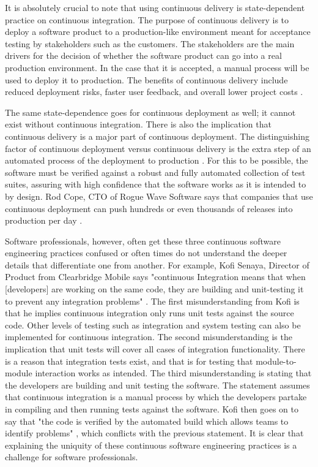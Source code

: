 \documentclass[12pt,a4paper]{article}
\begin{document}
It is absolutely crucial to note that using continuous delivery is state-dependent practice on continuous integration. The purpose of continuous delivery is to deploy a software product to a production-like environment meant for acceptance testing by stakeholders such as the customers. The stakeholders are the main drivers for the decision of whether the software product can go into a real production environment. In the case that it is accepted, a manual process will be used to deploy it to production. The benefits of continuous delivery include reduced deployment risks, faster user feedback, and overall lower project costs \cite[p. ~3910-3911]{shahin_babar_zhu_2017}.

The same state-dependence goes for continuous deployment as well; it cannot exist without continuous integration. There is also the implication that continuous delivery is a major part of continuous deployment. The distinguishing factor of continuous deployment versus continuous delivery is the extra step of an automated process of the deployment to production \cite[p. ~3911]{shahin_babar_zhu_2017}. For this to be possible, the software must be verified against a robust and fully automated collection of test suites, assuring with high confidence that the software works as it is intended to by design. Rod Cope, CTO of Rogue Wave Software says that companies that use continuous deployment can push hundreds or even thousands of releases into production per day \cite{stackify_2018}.

Software professionals, however, often get these three continuous software engineering practices confused or often times do not understand the deeper details that differentiate one from another. For example, Kofi Senaya, Director of Product from Clearbridge Mobile says "continuous Integration means that when [developers] are working on the same code, they are building and unit-testing it to prevent any integration problems" \cite{stackify_2018}. The first misunderstanding from Kofi is that he implies continuous integration only runs unit tests against the source code. Other levels of testing such as integration and system testing can also be implemented for continuous integration. The second misunderstanding is the implication that unit tests will cover all cases of integration functionality. There is a reason that integration tests exist, and that is for testing that module-to-module interaction works as intended. The third misunderstanding is stating that the developers are building and unit testing the software. The statement assumes that continuous integration is a manual process by which the developers partake in compiling and then running tests against the software. Kofi then goes on to say that "the code is verified by the automated build which allows teams to identify problems" \cite{stackify_2018}, which conflicts with the previous statement. It is clear that explaining the uniquity of these continuous software engineering practices is a challenge for software professionals.
\end{document}
